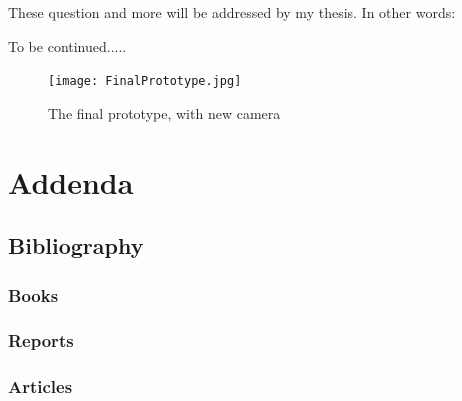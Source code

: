 \documentclass[11pt,fleqn,,a4paper,twoside,openright]{book}
\begin{document}
These question and more will be addressed by my thesis. In other words:

\begin{center}
	To be continued.....
\end{center}

\begin{figure}[h]
	\centering
	\texttt{[image: FinalPrototype.jpg]}
	\caption{The final prototype, with new camera}
	\label{fig:FinalPrototype}
\end{figure}

\part{Addenda}\label{part:Addenda}
\chapter*{Bibliography}
\section*{Books}
\printbibliography[heading=bibempty,type=book]
\section*{Reports}
\printbibliography[heading=bibempty,type=report]
\section*{Articles}
\printbibliography[heading=bibempty,type=article]

\cleardoublepage
{}
\setlength{\columnsep}{0.75cm}
\printindex

\appendix
{}
\end{document}
